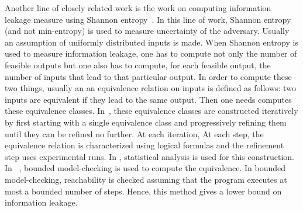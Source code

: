 Another line of closely related work is the work on computing information leakage measure using Shannon entropy~\cite{BackesKopf,Malacria07}. In this line of work, 
Shannon entropy (and not min-entropy) is used to measure uncertainty of the adversary. Usually an assumption of uniformly distributed inputs is made. When Shannon entropy is used to measure information leakage, one has to compute not only the number of feasible outputs but one also has to compute, for each feasible output,  the number of inputs that lead to that particular output. In order to compute these two things, usually an an equivalence relation on inputs is defined as follows: two inputs are equivalent if they lead to the same output. Then one needs computes these equivalence classes. In~\cite{BackesKopf}, these equivalence classes are constructed iteratively by first starting with a single equivalence class and progressively refining them until they can be refined no further. At each iteration,  At each step, the equivalence relation is characterized using logical formulas and the refinement step uses experimental runs. In \cite{Kopf}, statistical analysis is used for this construction. In ~\cite{Malacria07}, bounded model-checking is used to compute the equivalence. In bounded model-checking, reachability is checked assuming that the program executes at most a bounded number of steps. Hence, this method gives a lower bound on information leakage. 

%
%
%
%
